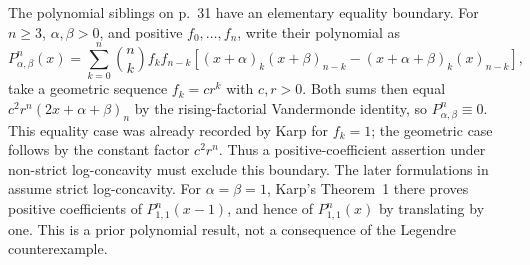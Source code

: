 \documentclass[11pt]{article}
\begin{document}
The polynomial siblings on p.~31 have an elementary equality boundary.
For $n\geq3$, $\alpha,\beta>0$, and positive $f_0,\ldots,f_n$, write
their polynomial as
\[
 P_{\alpha,\beta}^{n}(x)=\sum_{k=0}^n\binom nk f_kf_{n-k}
 [(x+\alpha)_k(x+\beta)_{n-k}-(x+\alpha+\beta)_k(x)_{n-k}],
\]
take a geometric sequence $f_k=cr^k$ with $c,r>0$.
Both sums then equal $c^2r^n(2x+\alpha+\beta)_n$ by the
rising-factorial Vandermonde identity, so $P_{\alpha,\beta}^{n}\equiv0$.
This equality case was already recorded by Karp
\cite[Lemma~3]{karppolynomial} for $f_k=1$; the geometric case follows
by the constant factor $c^2r^n$.
Thus a positive-coefficient assertion under non-strict log-concavity
must exclude this boundary. The later formulations in
\cite[p.~2, Conjectures~1--2]{karppolynomial} assume strict
log-concavity. For $\alpha=\beta=1$, Karp's Theorem~1 there proves
positive coefficients of $P_{1,1}^{n}(x-1)$, and hence of
$P_{1,1}^{n}(x)$ by translating by one. This is a prior polynomial
result, not a consequence of the Legendre counterexample.
\end{document}
